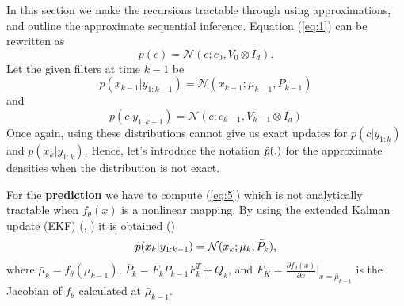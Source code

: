 \documentclass{mldsmsc}
\begin{document}
In this section we make the recursions tractable through using approximations, and outline the approximate sequential inference. Equation (\ref{eq:1}) can be rewritten as 
\begin{equation}
    p(c) = \mathcal{N}(c; c_0, V_0 \otimes I_d).
\end{equation}
Let the given filters at time $k-1$ be 
\begin{equation}
    p(x_{k-1} | y_{1:k-1}) = \mathcal{N}(x_{k-1};\mu_{k-1}, P_{k-1})
\end{equation}
and
\begin{equation}
    p(c | y_{1:k-1}) = \mathcal{N}(c; c_{k-1}, V_{k-1} \otimes I_d)
\end{equation}
Once again, using these distributions cannot give us exact updates for $p(c | y_{1:k})$ and $p(x_k | y_{1:k})$. Hence, let's introduce the notation $\Tilde{p}(.)$ for the approximate densities when the distribution is not exact. \newline

\noindent For the \textbf{prediction} we have to compute (\ref{eq:5}) which is not analytically tractable when $f_{\theta}(x)$ is a nonlinear mapping. By using the extended Kalman update (EKF) (\cite{mclean1962optimal}, \cite{anderson1979optimal}) it is obtained (\cite{akyildiz2021probabilistic})
\begin{equation}
    \Tilde{p}(x_k | y_{1:k-1}) = \mathcal{N}(x_k; \bar{\mu}_k, \bar{P}_k), 
\end{equation}
where $\bar{\mu}_k = f_{\theta}(\mu_{k-1})$, $\bar{P}_k = F_k P_{k-1} F^{T}_{k} + Q_k$, and $F_K = \frac{\partial f_{\theta}(x)}{\partial x} \vert_{x = \bar{\mu}_{k-1}}$ is the Jacobian of $f_{\theta}$ calculated at $\bar{\mu}_{k-1}$. \newline
\end{document}
